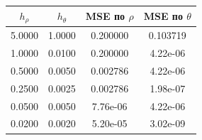 \begin{tabular}{|c|c|c|c|}
\hline
$h_\rho$ & $h_\theta$ & MSE по $\rho$ & MSE по $\theta$
\\
\hline
5.0000 & 1.0000 & 0.200000 & 0.103719
\\
\hline
1.0000 & 0.0100 & 0.200000 & 4.22e-06
\\
\hline
0.5000 & 0.0050 & 0.002786 & 4.22e-06
\\
\hline
0.2500 & 0.0025 & 0.002786 & 1.98e-07
\\
\hline
0.0500 & 0.0050 & 7.76e-06 & 4.22e-06
\\
\hline
0.0200 & 0.0020 & 5.20e-05 & 3.02e-09
\\
\hline
\end{tabular}
